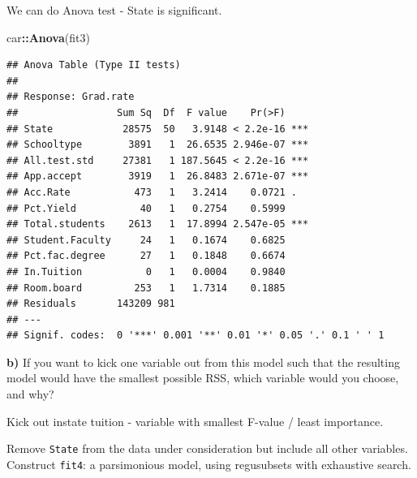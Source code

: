 \documentclass[]{article}
\newenvironment{Shaded}{\begin{snugshade}}{\end{snugshade}}
\newcommand{\KeywordTok}[1]{\textcolor[rgb]{0.13,0.29,0.53}{\textbf{#1}}}
\newcommand{\DataTypeTok}[1]{\textcolor[rgb]{0.13,0.29,0.53}{#1}}
\newcommand{\DecValTok}[1]{\textcolor[rgb]{0.00,0.00,0.81}{#1}}
\newcommand{\StringTok}[1]{\textcolor[rgb]{0.31,0.60,0.02}{#1}}
\newcommand{\OperatorTok}[1]{\textcolor[rgb]{0.81,0.36,0.00}{\textbf{#1}}}
\newcommand{\NormalTok}[1]{#1}
\begin{document}
We can do Anova test - State is significant.

\begin{Shaded}
\begin{Highlighting}[]
\NormalTok{car}\OperatorTok{::}\KeywordTok{Anova}\NormalTok{(fit3)}
\end{Highlighting}
\end{Shaded}

\begin{verbatim}
## Anova Table (Type II tests)
## 
## Response: Grad.rate
##                 Sum Sq  Df  F value    Pr(>F)    
## State            28575  50   3.9148 < 2.2e-16 ***
## Schooltype        3891   1  26.6535 2.946e-07 ***
## All.test.std     27381   1 187.5645 < 2.2e-16 ***
## App.accept        3919   1  26.8483 2.671e-07 ***
## Acc.Rate           473   1   3.2414    0.0721 .  
## Pct.Yield           40   1   0.2754    0.5999    
## Total.students    2613   1  17.8994 2.547e-05 ***
## Student.Faculty     24   1   0.1674    0.6825    
## Pct.fac.degree      27   1   0.1848    0.6674    
## In.Tuition           0   1   0.0004    0.9840    
## Room.board         253   1   1.7314    0.1885    
## Residuals       143209 981                       
## ---
## Signif. codes:  0 '***' 0.001 '**' 0.01 '*' 0.05 '.' 0.1 ' ' 1
\end{verbatim}

\textbf{b)} If you want to kick one variable out from this model such
that the resulting model would have the smallest possible RSS, which
variable would you choose, and why?

Kick out instate tuition - variable with smallest F-value / least
importance.

\vspace{.1in}

Remove \texttt{State} from the data under consideration but include all
other variables. Construct \texttt{fit4}: a parsimonious model, using
regusubsets with exhaustive search.

\begin{Shaded}
\end{Shaded}
\end{document}
